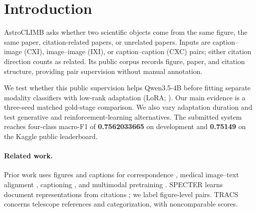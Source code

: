 \begin{abstract}
We adapt Qwen3.5-4B on public caption--image pairs labeled from figure identities, paper identities, and citation links before gold training on AstroCLIMB. Across three gold-training seeds sharing one public checkpoint, this initialization improves caption--image development macro-F1 by 0.0674 on average over gold-only training, with matched gold schedules but more total compute. Increasing public adaptation from 2,000 to 4,000 updates helps paper-relation classes; 8,000 updates bring no net gain. Answer generation and the reinforcement-learning variants we tested do not beat the classifier. The submitted system combines separate modality classifiers and scores 0.75149 on the Kaggle public leaderboard. Repeated development selection and earlier project exposure confine these findings to the evaluated setting.
\end{abstract}

\section{Introduction}

AstroCLIMB \citep{astroclimb} asks whether two scientific objects come from the same figure, the same paper, citation-related papers, or unrelated papers. Inputs are caption--image (CXI), image--image (IXI), or caption--caption (CXC) pairs; either citation direction counts as related. Its public corpus records figure, paper, and citation structure, providing pair supervision without manual annotation.

We test whether this public supervision helps Qwen3.5-4B \citep{qwen35} before fitting separate modality classifiers with low-rank adaptation (LoRA; \citealp{lora}). Our main evidence is a three-seed matched gold-stage comparison. We also vary adaptation duration and test generative and reinforcement-learning alternatives. The submitted system reaches four-class macro-F1 of \textbf{0.7562033665} on development and \textbf{0.75149} on the Kaggle public leaderboard.

\paragraph{Related work.}
Prior work uses figures and captions for correspondence \citep{lookreadenrich}, medical image--text alignment \citep{subramanian-etal-2020-medicat}, captioning \citep{hsu-etal-2021-scicap-generating}, and multimodal pretraining \citep{sciol}. SPECTER learns document representations from citations \citep{cohan-etal-2020-specter}; we label figure-level pairs. TRACS \citep{grezes-etal-2025-overview} concerns telescope references and categorization, with noncomparable scores.

